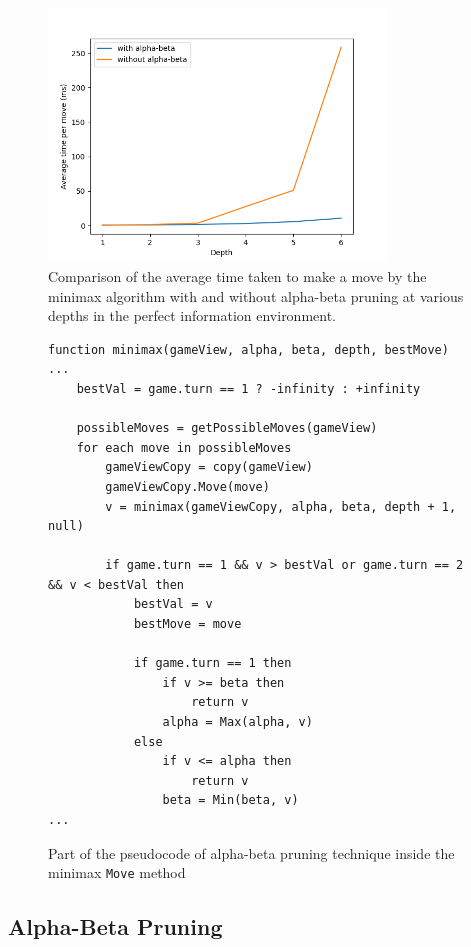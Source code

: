 \begin{figure}[h]
  \centering
  \captionsetup{justification=centering}
  \includegraphics[width=0.8\textwidth]{../img/alpha-beta_comparison.png}
  \caption{Comparison of the average time taken to make a move by the minimax algorithm with and without alpha-beta pruning at various depths in the perfect information environment.}
  \label{WithWithoutAlphaBeta}
\end{figure}


\begin{figure}[h!]
\captionsetup{justification=centering}
\begin{lstlisting}
function minimax(gameView, alpha, beta, depth, bestMove)
...
    bestVal = game.turn == 1 ? -infinity : +infinity
	
    possibleMoves = getPossibleMoves(gameView)
    for each move in possibleMoves
        gameViewCopy = copy(gameView)
        gameViewCopy.Move(move)
        v = minimax(gameViewCopy, alpha, beta, depth + 1, null)
        	
        if game.turn == 1 && v > bestVal or game.turn == 2 && v < bestVal then
            bestVal = v
            bestMove = move
        		
            if game.turn == 1 then 
                if v >= beta then 
                    return v
                alpha = Max(alpha, v)
            else
                if v <= alpha then
                    return v
                beta = Min(beta, v)
...
\end{lstlisting}
\caption{Part of the pseudocode of alpha-beta pruning technique inside the minimax \texttt{Move} method}
\label{fig:alphabeta}
\end{figure}


\subsection{Alpha-Beta Pruning}


